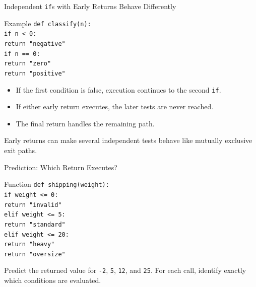 \documentclass[aspectratio=169,10pt]{beamer}
\begin{document}
\begin{frame}{Independent \texttt{if}s with Early Returns Behave Differently}
  \begin{block}{Example}
    \texttt{def classify(n):}\\
    \hspace*{0.20in}\texttt{if n < 0:}\\
    \hspace*{0.40in}\texttt{return "negative"}\\
    \hspace*{0.20in}\texttt{if n == 0:}\\
    \hspace*{0.40in}\texttt{return "zero"}\\
    \hspace*{0.20in}\texttt{return "positive"}
  \end{block}

  \begin{itemize}
    \item If the first condition is false, execution continues to the second \texttt{if}.
    \item If either early return executes, the later tests are never reached.
    \item The final return handles the remaining path.
  \end{itemize}

  \begin{keyidea}
    Early returns can make several independent tests behave like mutually exclusive exit paths.
  \end{keyidea}
\end{frame}

\begin{frame}{Prediction: Which Return Executes?}
  \begin{block}{Function}
    \texttt{def shipping(weight):}\\
    \hspace*{0.20in}\texttt{if weight <= 0:}\\
    \hspace*{0.40in}\texttt{return "invalid"}\\
    \hspace*{0.20in}\texttt{elif weight <= 5:}\\
    \hspace*{0.40in}\texttt{return "standard"}\\
    \hspace*{0.20in}\texttt{elif weight <= 20:}\\
    \hspace*{0.40in}\texttt{return "heavy"}\\
    \hspace*{0.20in}\texttt{return "oversize"}
  \end{block}

  \begin{activity}
    Predict the returned value for \texttt{-2}, \texttt{5}, \texttt{12}, and \texttt{25}. For each call, identify exactly which conditions are evaluated.
  \end{activity}
\end{frame}
\end{document}

